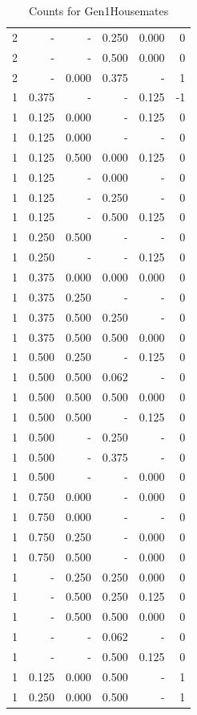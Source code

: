 \documentclass[a4paper]{article}\usepackage[]{graphicx}\usepackage[]{color}
\begin{document}
\begin{table}[ht]
\begin{tabular}{rrrrrr}
   \rowcolor{sosoColor} 2 & - & - & 0.250 & 0.000 & 0 \\ 
   \rowcolor{sosoColor} 2 & - & - & 0.500 & 0.000 & 0 \\ 
   \rowcolor{badColor} 2 & - & 0.000 & 0.375 & - & 1 \\ 
   \rowcolor{nullColor} 1 & 0.375 & - & - & 0.125 & -1 \\ 
  1 & 0.125 & 0.000 & - & 0.125 & 0 \\ 
  1 & 0.125 & 0.000 & - & - & 0 \\ 
   \rowcolor{badColor} 1 & 0.125 & 0.500 & 0.000 & 0.125 & 0 \\ 
   \rowcolor{sosoColor} 1 & 0.125 & - & 0.000 & - & 0 \\ 
   \rowcolor{sosoColor} 1 & 0.125 & - & 0.250 & - & 0 \\ 
   \rowcolor{sosoColor} 1 & 0.125 & - & 0.500 & 0.125 & 0 \\ 
  1 & 0.250 & 0.500 & - & - & 0 \\ 
   \rowcolor{nullColor} 1 & 0.250 & - & - & 0.125 & 0 \\ 
   \rowcolor{goodColor} 1 & 0.375 & 0.000 & 0.000 & 0.000 & 0 \\ 
  1 & 0.375 & 0.250 & - & - & 0 \\ 
   \rowcolor{badColor} 1 & 0.375 & 0.500 & 0.250 & - & 0 \\ 
   \rowcolor{goodColor} 1 & 0.375 & 0.500 & 0.500 & 0.000 & 0 \\ 
  1 & 0.500 & 0.250 & - & 0.125 & 0 \\ 
   \rowcolor{badColor} 1 & 0.500 & 0.500 & 0.062 & - & 0 \\ 
   \rowcolor{goodColor} 1 & 0.500 & 0.500 & 0.500 & 0.000 & 0 \\ 
  1 & 0.500 & 0.500 & - & 0.125 & 0 \\ 
   \rowcolor{sosoColor} 1 & 0.500 & - & 0.250 & - & 0 \\ 
   \rowcolor{sosoColor} 1 & 0.500 & - & 0.375 & - & 0 \\ 
   \rowcolor{nullColor} 1 & 0.500 & - & - & 0.000 & 0 \\ 
  1 & 0.750 & 0.000 & - & 0.000 & 0 \\ 
  1 & 0.750 & 0.000 & - & - & 0 \\ 
  1 & 0.750 & 0.250 & - & 0.000 & 0 \\ 
  1 & 0.750 & 0.500 & - & 0.000 & 0 \\ 
   \rowcolor{goodColor} 1 & - & 0.250 & 0.250 & 0.000 & 0 \\ 
   \rowcolor{badColor} 1 & - & 0.500 & 0.250 & 0.125 & 0 \\ 
   \rowcolor{goodColor} 1 & - & 0.500 & 0.500 & 0.000 & 0 \\ 
   \rowcolor{sosoColor} 1 & - & - & 0.062 & - & 0 \\ 
   \rowcolor{sosoColor} 1 & - & - & 0.500 & 0.125 & 0 \\ 
   \rowcolor{badColor} 1 & 0.125 & 0.000 & 0.500 & - & 1 \\ 
   \rowcolor{badColor} 1 & 0.250 & 0.000 & 0.500 & - & 1 \\ 
   \hline
\end{tabular}
\caption{Counts for Gen1Housemates} 
\end{table}
\end{document}
